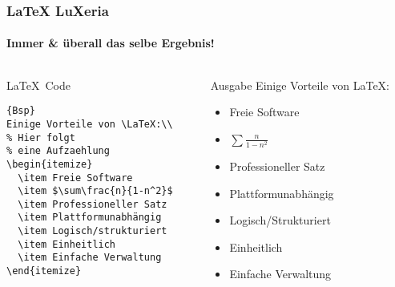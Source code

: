 \begin{frame}[fragile]
    \frametitle{\LaTeX \hfill{} \footnotesize{LuXeria}}
    \framesubtitle{Immer \& überall das selbe Ergebnis!}
    \begin{columns}
        \begin{column}{5cm}
            \begin{block}{\LaTeX~Code}
                
\begin{lstlisting}{Bsp}
Einige Vorteile von \LaTeX:\\
% Hier folgt 
% eine Aufzaehlung
\begin{itemize}
  \item Freie Software
  \item $\sum\frac{n}{1-n^2}$
  \item Professioneller Satz
  \item Plattformunabhängig
  \item Logisch/strukturiert
  \item Einheitlich
  \item Einfache Verwaltung
\end{itemize}
\end{lstlisting}
                
            \end{block}
        \end{column}
        \begin{column}{5cm}
            \begin{block}{Ausgabe}
                Einige Vorteile von \LaTeX:\\
                \begin{itemize}
                    \item Freie Software
                    \item $\sum\frac{n}{1-n^2}$
                    \item Professioneller Satz
                    \item Plattformunabhängig
                    \item Logisch/Strukturiert
                    \item Einheitlich
                    \item Einfache Verwaltung
                \end{itemize}
            \end{block}
        \end{column}
    \end{columns}
\end{frame}

